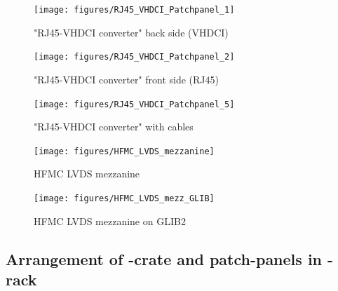 \begin{figure}[htb]
\centering
\texttt{[image: figures/RJ45\_VHDCI\_Patchpanel\_1]}
\caption{"RJ45-VHDCI converter" back side (VHDCI)} 
\label{fig:com-hard:rj45_vhdci_patchpanel_1}
\end{figure}

\begin{figure}[htb]
\centering
\texttt{[image: figures/RJ45\_VHDCI\_Patchpanel\_2]}
\caption{"RJ45-VHDCI converter" front side (RJ45)} 
\label{fig:com-hard:rj45_vhdci_patchpanel_2}
\end{figure}

\begin{figure}[htb]
\centering
\texttt{[image: figures/RJ45\_VHDCI\_Patchpanel\_5]}
\caption{"RJ45-VHDCI converter" with cables} 
\label{fig:com-hard:rj45_vhdci_patchpanel_5}
\end{figure}

\begin{figure}[htb]
\centering
\texttt{[image: figures/HFMC\_LVDS\_mezzanine]}
\caption{HFMC LVDS mezzanine} 
\label{fig:com-hard:hfmc_lvds_mezzanine}
\end{figure}

\begin{figure}[htb]
\centering
\texttt{[image: figures/HFMC\_LVDS\_mezz\_GLIB]}
\caption{HFMC LVDS mezzanine on GLIB2} 
\label{fig:com-hard:hfmc_lvds_mezz_glib}
\end{figure}

\clearpage

\subsection{Arrangement of \ugt-crate and patch-panels in \ugt-rack}\label{sec:com-hard:cabling_mgt_rack}

